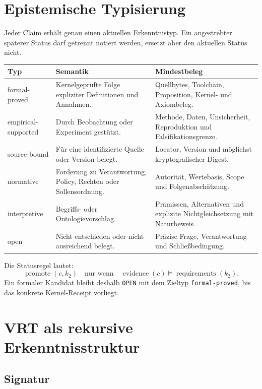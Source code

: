 \documentclass[11pt,a4paper]{article}
\newcommand{\code}[1]{\texttt{#1}}
\begin{document}
\section{Epistemische Typisierung}

Jeder Claim erhält genau einen aktuellen Erkenntnistyp. Ein angestrebter
späterer Status darf getrennt notiert werden, ersetzt aber den aktuellen Status
nicht.

\begin{longtable}{>{\ttfamily}p{}p{}p{}}
\toprule
Typ & Semantik & Mindestbeleg \\
\midrule
\endhead
formal-proved & Kernelgeprüfte Folge expliziter Definitionen und Annahmen. &
Quellbytes, Toolchain, Proposition, Kernel- und Axiombeleg. \\
empirical-supported & Durch Beobachtung oder Experiment gestützt. & Methode,
Daten, Unsicherheit, Reproduktion und Falsifikationsgrenze. \\
source-bound & Für eine identifizierte Quelle oder Version belegt. & Locator,
Version und möglichst kryptografischer Digest. \\
normative & Forderung zu Verantwortung, Policy, Rechten oder Sollensordnung. &
Autorität, Wertebasis, Scope und Folgenabschätzung. \\
interpretive & Begriffs- oder Ontologievorschlag. & Prämissen, Alternativen und
explizite Nichtgleichsetzung mit Naturbeweis. \\
open & Nicht entschieden oder nicht ausreichend belegt. & Präzise Frage,
Verantwortung und Schließbedingung. \\
\bottomrule
\end{longtable}

Die Statusregel lautet:
\begin{equation}
  \operatorname{promote}(c,k_2)
  \quad\text{nur wenn}\quad
  \operatorname{evidence}(c)\models
  \operatorname{requirements}(k_2).
\end{equation}
Ein formaler Kandidat bleibt deshalb \code{OPEN} mit dem Zieltyp
\code{formal-proved}, bis das konkrete Kernel-Receipt vorliegt.

\section{VRT als rekursive Erkenntnisstruktur}

\subsection{Signatur}
\end{document}
